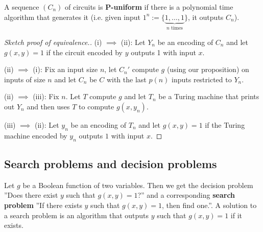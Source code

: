 \documentclass{article}
\theoremstyle{definition}
\begin{document}
A sequence $(C_n)$ of circuits is \textbf{P-uniform} if there is a polynomial time algorithm that generates it (i.e. given input $1^n := \{\underbrace{1,\ldots,1}_{n \text{ times}}\}$, it outputs $C_n$).
\begin{proof}[Sketch proof of equivalence.]
    (i) $\implies $ (ii): Let $Y_n$ be an encoding of $C_n$ and let $g(x,y)=1$ if the circuit encoded by $y$ outputs 1 with input $x$.
    \vspace{1mm}
     
    (ii) $\implies $ (i): Fix an input size $n$, let $C_n'$ compute $g$ (using our proposition) on inputs of size $n$ and let $C_n$ be $C$ with the last $p(n)$ inputs restricted to $Y_n$.
    \vspace{1mm}
     
    (ii) $\implies $ (iii): Fix $n$. Let $T$ compute $g$ and let $T_n$ be a Turing machine that prints out $Y_n$ and then uses $T$ to compute $g(x,y_n)$.
    \vspace{1mm}
     
    (iii) $\implies $ (ii): Let $y_n$ be an encoding of $T_n$ and let $g(x,y)=1$ if the Turing machine encoded by $y_n$ outputs $1$ with input $x$.
\end{proof}
\subsection{Search problems and decision problems}
Let $g$ be a Boolean function of two variables. Then we get the decision problem ''Does there exist $y$ such that $g(x,y)=1$?'' and a corresponding \textbf{search problem} ''If there exists $y$ such that $g(x,y)=1$, then find one.''. A solution to a search problem is an algorithm that outputs $y$ such that $g(x,y)=1$ if it exists. 
\end{document}
